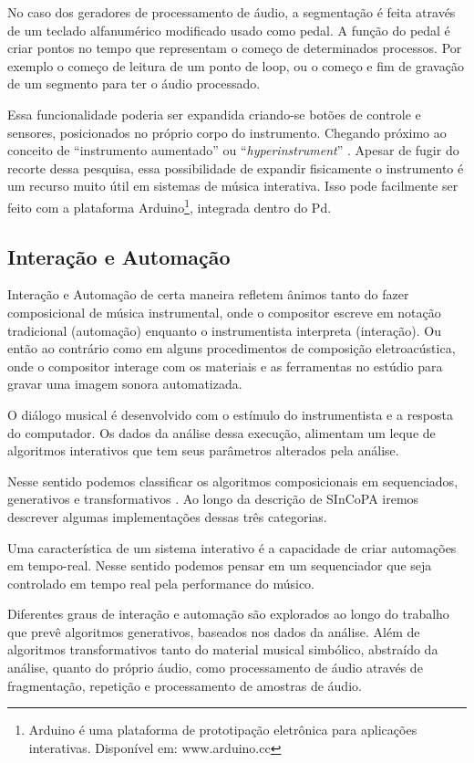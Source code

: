 \documentclass[draft]{ppgmus}
\begin{document}
No caso dos geradores de processamento de áudio, a segmentação é feita 
através de um teclado alfanumérico modificado usado como pedal. A função
do pedal é criar pontos no tempo que representam o começo de determinados
processos. Por exemplo o começo de leitura de um ponto de loop, ou o começo
e fim de gravação de um segmento para ter o áudio processado.

Essa funcionalidade poderia ser expandida criando-se botões de controle
e sensores, posicionados no próprio corpo do instrumento. Chegando próximo ao conceito
de ``instrumento aumentado'' ou ``\textit{hyperinstrument}'' \cite{hyperinstrumento}. 
Apesar de fugir do recorte dessa pesquisa, essa possibilidade
de expandir fisicamente o instrumento é um recurso muito útil em sistemas de
música interativa. Isso pode facilmente ser feito com a plataforma Arduino\footnote{Arduino
é uma plataforma de prototipação eletrônica para aplicações interativas. Disponível em: 
www.arduino.cc}, integrada dentro do Pd. 




\subsection{Interação e Automação}

Interação e Automação de certa maneira refletem ânimos tanto do
fazer composicional de música instrumental, onde o compositor
escreve em notação tradicional (automação) enquanto o instrumentista
interpreta (interação). Ou então ao contrário como em alguns procedimentos
de composição eletroacústica, onde o compositor interage com os materiais
e as ferramentas no estúdio para gravar uma imagem sonora automatizada.

O diálogo musical é desenvolvido com o estímulo
do instrumentista e a resposta do computador. Os dados
da análise dessa execução, alimentam um leque de algoritmos
interativos que tem seus parâmetros alterados pela análise.

Nesse sentido podemos classificar os algoritmos composicionais
em sequenciados, generativos e transformativos \cite{rowe93:interactive}.
Ao longo da descrição de SInCoPA iremos descrever algumas implementações
dessas três categorias.

Uma característica de um sistema interativo é a capacidade de criar
automações em tempo-real. Nesse sentido podemos pensar em um sequenciador
que seja controlado em tempo real pela performance do músico.

Diferentes graus de interação e automação são explorados ao longo do
trabalho que prevê algoritmos generativos, baseados nos dados da análise. 
Além de algoritmos transformativos tanto do material musical simbólico,
abstraído da análise, quanto do próprio áudio, como processamento de áudio
através de fragmentação, repetição e processamento de amostras de áudio.
\end{document}
